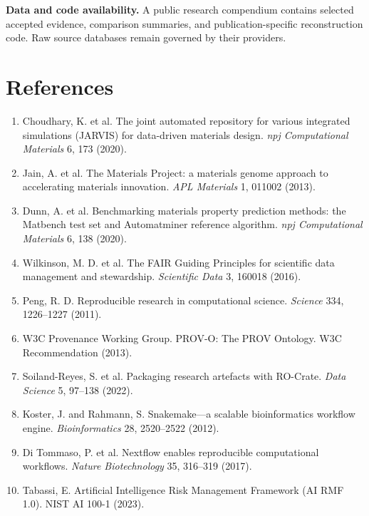 \documentclass[10pt,a4paper]{article}
\begin{document}
\textbf{Data and code availability.} A public research compendium contains selected accepted evidence, comparison summaries, and publication-specific reconstruction code. Raw source databases remain governed by their providers.

\section*{References}\small
\begin{enumerate}
\item Choudhary, K. et al. The joint automated repository for various integrated simulations (JARVIS) for data-driven materials design. \emph{npj Computational Materials} 6, 173 (2020).
\item Jain, A. et al. The Materials Project: a materials genome approach to accelerating materials innovation. \emph{APL Materials} 1, 011002 (2013).
\item Dunn, A. et al. Benchmarking materials property prediction methods: the Matbench test set and Automatminer reference algorithm. \emph{npj Computational Materials} 6, 138 (2020).
\item Wilkinson, M. D. et al. The FAIR Guiding Principles for scientific data management and stewardship. \emph{Scientific Data} 3, 160018 (2016).
\item Peng, R. D. Reproducible research in computational science. \emph{Science} 334, 1226--1227 (2011).
\item W3C Provenance Working Group. PROV-O: The PROV Ontology. W3C Recommendation (2013).
\item Soiland-Reyes, S. et al. Packaging research artefacts with RO-Crate. \emph{Data Science} 5, 97--138 (2022).
\item Koster, J. and Rahmann, S. Snakemake---a scalable bioinformatics workflow engine. \emph{Bioinformatics} 28, 2520--2522 (2012).
\item Di Tommaso, P. et al. Nextflow enables reproducible computational workflows. \emph{Nature Biotechnology} 35, 316--319 (2017).
\item Tabassi, E. Artificial Intelligence Risk Management Framework (AI RMF 1.0). NIST AI 100-1 (2023).
\end{enumerate}
\end{document}
